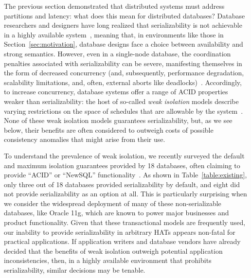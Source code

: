 The previous section demonstrated that distributed systems must
address partitions and latency: what does this mean for distributed
databases? Database researchers and designers have long realized that
serializability is not achievable in a highly available
system~\cite{davidson-survey}, meaning that, in environments like
those in Section~\ref{sec:motivation}, database designs face a choice
between availability and strong semantics. However, even in a
single-node database, the coordination penalties associated with
serializability can be severe, manifesting themselves in the form of
decreased concurrency (and, subsequently, performance degradation,
scalability limitations, and, often, external aborts like
deadlocks)~\cite{gray-isolation}. Accordingly, to increase
concurrency, database systems offer a range of ACID properties weaker
than serializability: the host of so-called \textit{weak isolation}
models describe varying restrictions on the space of schedules that
are allowable by the system~\cite{adya, ansi-sql, ansicritique}. None
of these weak isolation models guarantees serializability, but, as we see below,
their benefits are often considered to outweigh costs of possible
consistency anomalies that might arise from their use.

To understand the prevalence of weak isolation, we
recently surveyed the default and maximum isolation guarantees provided by
18 databases, often claiming to provide ``ACID'' or ``NewSQL''
functionality~\cite{hat-hotos}. As shown in
Table~\ref{table:existing}, only three out of 18 databases provided
serializability by default, and eight did not provide serializability
as an option at all. This is particularly surprising when we consider
the widespread deployment of many of these non-serializable databases,
like Oracle 11g, which are known to power major businesses and product
functionality. Given that these transactional models are frequently
used, our inability to provide serializability in arbitrary HATs
appears non-fatal for practical applications. If application writers
and database vendors have already decided that the benefits of weak
isolation outweigh potential application inconsistencies, then, in a
highly available environment that prohibits serializability, similar
decisions may be tenable.

